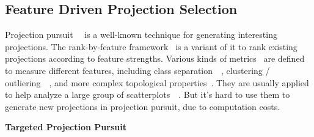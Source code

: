 \subsection{Feature Driven Projection Selection}
Projection pursuit~\cite{DBLP:journals/tc/FriedmanT74}~\cite{cook1995grand} is a well-known technique for generating interesting projections. The rank-by-feature framework~\cite{DBLP:journals/ivs/SeoS05} is a variant of it to rank existing projections according to feature strengths. Various kinds of metrics~\cite{DBLP:conf/ieeevast/AlbuquerqueEM11} are defined to measure different features, including class separation~\cite{DBLP:journals/cgf/SipsNLH09}~\cite{DBLP:journals/cgf/SedlmairTMT12}, clustering / outliering~\cite{DBLP:conf/ieeevast/TatuAESTMK09}~\cite{DBLP:journals/tvcg/JohanssonJ09}, and more complex topological properties~\cite{DBLP:conf/infovis/WilkinsonAG05}. They are usually applied to help analyze a large group of scatterplots~\cite{DBLP:conf/apvis/NhonW14}~\cite{DBLP:conf/ieeevast/AnandWN12}. But it's hard to use them to generate new projections in projection pursuit, due to computation costs.

\textbf{Targeted Projection Pursuit}
~\cite{DBLP:journals/tvcg/JoiaCCPN11}~\cite{DBLP:conf/ieeevast/BrownLBC12}~\cite{DBLP:journals/tvcg/Gleicher13}~\cite{DBLP:journals/tvcg/HuBMHNL13}